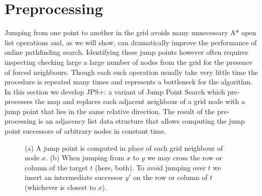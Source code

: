 \section{Preprocessing}
\label{sec::preprocessing}
%
%

Jumping from one point to another in the grid avoids many unnecessary A* open
list operations and, as we will show, can dramatically improve the performance 
of online pathfinding search.
Identifying these jump points however often requires inspecting checking large
a large number of nodes from the grid for the presence of forced neighbours.
Though each such operation usually take very little time the procedure is 
repeated many times and represents a bottleneck for the algorithm.  In
this section we develop JPS+: a variant of Jump Point Search which
pre-processes the map and replaces each adjacent neighbour of a grid node with
a jump point that lies in the same relative direction. The result of the
pre-processing is an adjacency list data structure that allows computing the
jump point successors of arbitrary nodes in constant time.


\begin{figure}[tb]
       \begin{center}
         \scalebox{.8}{}
       \end{center}
	\vspace{-3pt}
       \caption{(a) A jump point is computed in place of each grid neighbour of node $x$.
		(b) When jumping from $x$ to $y$ we may cross the row or column of the target $t$ (here, both). 
To avoid jumping over $t$ we insert an intermediate successor $y'$ on the row or column of $t$ (whichever is closest to $x$).}

       \label{fig:preproc}
\end{figure}


